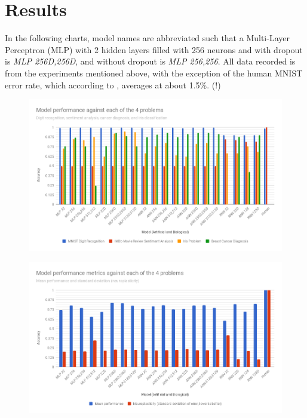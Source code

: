 \documentclass[]{report}
\begin{document}
\section{Results}

In the following charts, model names are abbreviated such that a Multi-Layer Perceptron (MLP) with 2 hidden layers filled with 256 neurons and with dropout is \textit{MLP 256D,256D}, and without dropout is \textit{MLP 256,256}. All data recorded is from the experiments mentioned above, with the exception of the human MNIST error rate, which according to \cite{simard1993efficient}, averages at about 1.5\%. (!)

\begin{figure}[H]
	\centering
	\includegraphics[width=\linewidth]{chart.png}
	\label{fig:chart0}
\end{figure}

\begin{figure}[H]
	\centering
	\includegraphics[width=\linewidth]{chart1.png}
	\label{fig:chart1}
\end{figure}
\end{document}
